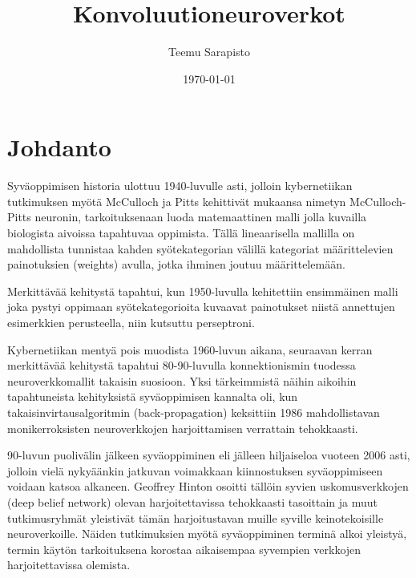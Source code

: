 \documentclass[finnish]{tktltiki2}
\title{Konvoluutioneuroverkot}
\author{Teemu Sarapisto}
\date{\today}
\theoremstyle{definition}
\theoremstyle{remark}
\begin{document}

  \frontmatter      %

  \maketitle        %
  \makeabstract     %

  \tableofcontents  %


  \mainmatter       %

  \section{Johdanto}
   Syväoppimisen historia ulottuu 1940-luvulle asti, jolloin kybernetiikan tutkimuksen myötä McCulloch ja Pitts kehittivät mukaansa nimetyn McCulloch-Pitts neuronin, tarkoituksenaan luoda matemaattinen malli jolla kuvailla biologista aivoissa tapahtuvaa oppimista. Tällä lineaarisella mallilla on mahdollista tunnistaa kahden syötekategorian välillä kategoriat määrittelevien painotuksien (weights) avulla, jotka ihminen joutuu määrittelemään. 
  
  Merkittävää kehitystä tapahtui, kun 1950-luvulla kehitettiin ensimmäinen malli joka pystyi oppimaan syötekategorioita kuvaavat painotukset niistä annettujen esimerkkien perusteella, niin kutsuttu perseptroni.  

  Kybernetiikan mentyä pois muodista 1960-luvun aikana, seuraavan kerran merkittävää kehitystä tapahtui 80-90-luvulla konnektionismin tuodessa neuroverkkomallit takaisin suosioon. Yksi tärkeimmistä näihin aikoihin tapahtuneista kehityksistä syväoppimisen kannalta oli, kun takaisinvirtausalgoritmin (back-propagation) keksittiin 1986 mahdollistavan monikerroksisten neuroverkkojen harjoittamisen verrattain tehokkaasti.

  90-luvun puolivälin jälkeen syväoppiminen eli jälleen hiljaiseloa vuoteen 2006 asti, jolloin vielä nykyäänkin jatkuvan voimakkaan kiinnostuksen syväoppimiseen voidaan katsoa alkaneen. Geoffrey Hinton osoitti tällöin syvien uskomusverkkojen (deep belief network) olevan harjoitettavissa tehokkaasti tasoittain ja muut tutkimusryhmät yleistivät tämän harjoitustavan muille syville keinotekoisille neuroverkoille. Näiden tutkimuksien myötä syväoppiminen terminä alkoi yleistyä, termin käytön tarkoituksena korostaa aikaisempaa syvempien verkkojen harjoitettavissa olemista. 
  
\end{document}
